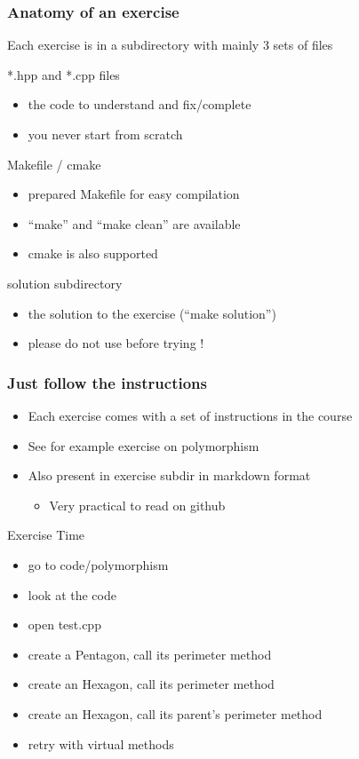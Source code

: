 \documentclass[compress]{beamer}
\begin{document}
\begin{frame}
  \frametitle{Anatomy of an exercise}
  Each exercise is in a subdirectory with mainly 3 sets of files
  \begin{exampleblock}{*.hpp and *.cpp files}
    \begin{itemize}
    \item the code to understand and fix/complete
    \item you never start from scratch
    \end{itemize}
  \end{exampleblock}
  \begin{block}{Makefile / cmake}
    \begin{itemize}
    \item prepared Makefile for easy compilation
    \item ``make'' and ``make clean'' are available
    \item cmake is also supported
    \end{itemize}
  \end{block}
  \begin{alertblock}{solution subdirectory}
    \begin{itemize}
    \item the solution to the exercise (``make solution'')
    \item please do not use before trying !
    \end{itemize}
  \end{alertblock}
\end{frame}

\begin{frame}
  \frametitle{Just follow the instructions}
  \begin{itemize}
  \item Each exercise comes with a set of instructions in the course
  \item See for example exercise on polymorphism
  \item Also present in exercise subdir in markdown format
    \begin{itemize}
    \item Very practical to read on github
    \end{itemize}
  \end{itemize}
  \begin{alertblock}{Exercise Time}
    \begin{itemize}
    \item go to code/polymorphism
    \item look at the code
    \item open test.cpp
    \item create a Pentagon, call its perimeter method
    \item create an Hexagon, call its perimeter method
    \item create an Hexagon, call its parent's perimeter method
    \item retry with virtual methods
    \end{itemize}
  \end{alertblock}
\end{frame}
\end{document}
